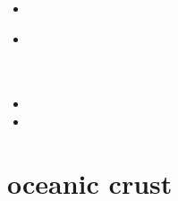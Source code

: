 \begin{scriptsize}
\begin{itemize}
\item[\twothousandsix]
\item[\twothousandthirteen]
 \\
 \\
 \\
\item[\twothousandfourteen]
\item[\twothousandfifteen]
\end{itemize}
\end{scriptsize}

















\section{oceanic crust} 

